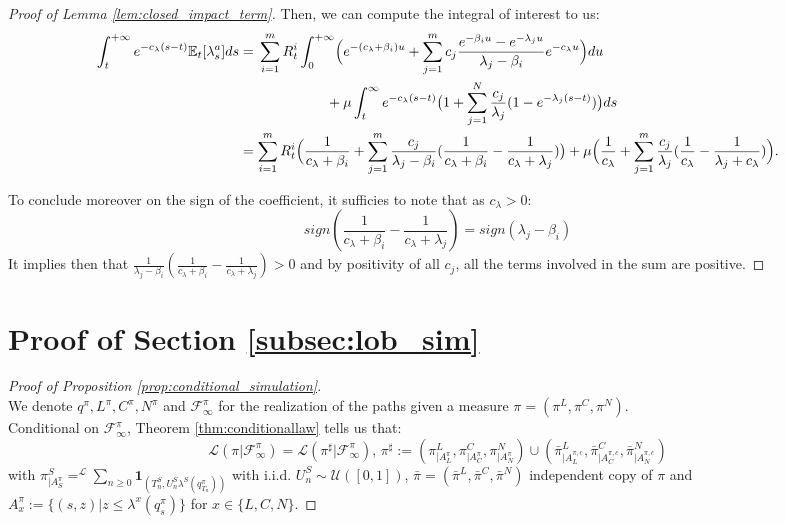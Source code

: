 \documentclass{article} %
\newcommand{\1}{\mathbbm{1}} %
\newcommand{\ind}{\mathbf{1}}
\begin{document}
\begin{as}
\begin{proof}[Proof of Lemma \ref{lem:closed_impact_term}]
    Then, we can compute the integral of interest to us:
    \begin{align*}
        \int_t^{+\infty} e^{-c_{\lambda}(s-t)} \mathbb{E}_t[\lambda^a_s] ds 
        &= \begin{multlined}[t]
            \sum_{i=1}^m R^i_t \int_0^{+\infty} \Bigl(e^{-(c_\lambda + \beta_i) u} + \sum_{j=1}^m c_j \frac{e^{-\beta_i u} - e^{-\lambda_j u}}{\lambda_j - \beta_i} e^{-c_\lambda u}\Bigr) du \\
            + \mu \int_{t}^{\infty} e^{-c_\lambda (s-t)} \bigl(1 + \sum_{j=1}^N \frac{c_j}{\lambda_j}(1 - e^{-\lambda_j (s-t)})\bigr) ds
           \end{multlined} \\
        &= \sum_{i=1}^m R^i_t \Bigl(\frac{1}{c_\lambda + \beta_i} + \sum_{j=1}^m \frac{c_j}{\lambda_j - \beta_i} (\frac{1}{c_\lambda + \beta_i} - \frac{1}{c_\lambda + \lambda_j})\bigr) + \mu \Bigl( \frac{1}{c_\lambda} + \sum_{j=1}^m \frac{c_j}{\lambda_j} (\frac{1}{c_\lambda} - \frac{1}{\lambda_j + c_\lambda})\Bigr).
    \end{align*}
    
    To conclude moreover on the sign of the coefficient, it sufficies to note that as $c_\lambda > 0$:
    $$sign(\frac{1}{c_\lambda + \beta_i} - \frac{1}{c_\lambda + \lambda_j}) = sign(\lambda_j - \beta_i)$$
    It implies then that $\frac{1}{\lambda_j - \beta_i} (\frac{1}{c_\lambda + \beta_i} - \frac{1}{c_\lambda + \lambda_j}) > 0$ and by positivity of all $c_j$, all the terms involved in the sum are positive.
\end{proof}

\section{Proof of Section \ref{subsec:lob_sim}} \label{appendix:section_four_one}

\begin{proof}[Proof of Proposition \ref{prop:conditional_simulation}]
    \leavevmode \\
    We denote $q^\pi, L^\pi, C^\pi, N^\pi$ and $\mathcal{F}^\pi_\infty$ for the realization of the paths given a measure $\pi = (\pi^L, \pi^C, \pi^N)$.\\
    Conditional on $\mathcal{F}^\pi_\infty$, Theorem \ref{thm:conditionallaw} tells us that: 
    $$\mathcal{L}(\pi | \mathcal{F}^\pi_\infty) = \mathcal{L}(\pi^\sharp|\mathcal{F}^\pi_\infty), \, \pi^\sharp := (\pi^L_{|A_L^\pi}, \pi^C_{|A^\pi_C}, \pi^N_{|A^\pi_N}) \cup (\bar{\pi}^L_{|A^{\pi, c}_L}, \bar{\pi}^C_{|A^{\pi, c}_C}, \bar{\pi}^N_{|A^{\pi, c}_N})$$
    with $\pi^S_{|A^\pi_S} =^{\mathcal{L}} \sum_{n \geq 0} \ind_{(T_n^S, U_n^S \lambda^S(q^\pi_{T_n}))}$ with i.i.d. $U^S_n \sim \mathcal{U}([0,1])$, $\bar{\pi} = (\bar{\pi}^L, \bar{\pi}^C, \bar{\pi}^N)$ independent copy of $\pi$ and $A^\pi_x := \{ (s,z)|z \leq \lambda^x(q^\pi_s)\}$ for $x \in \{ L,C,N\}$.


\end{proof}
\end{as}
\end{document}

